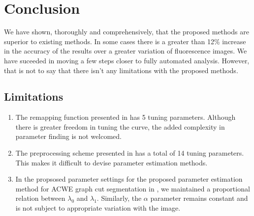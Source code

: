 
\chapter{Conclusion} %

\label{chap:Chapter7} %

We have shown, thoroughly and comprehensively, that the proposed methods are superior to existing methods. In some cases there is a greater than 12\% increase in the accuracy of the results over a greater variation of fluorescence images. We have suceeded in moving a few steps closer to fully automated analysis. However, that is not to say that there isn't any limitations with the proposed methods.

\section{Limitations}

\begin{enumerate}
	\item The remapping function presented in  has 5 tuning parameters. Although there is greater freedom in tuning the curve, the added complexity in parameter finding is not welcomed.
	
	\item The preprocessing scheme presented in  has a total of 14 tuning parameters. This makes it difficult to devise parameter estimation methods.
	
	\item In the propsosed parameter settings for the proposed parameter estimation method for ACWE graph cut segmentation in , we maintained a proportional relation between $\lambda_0$ and $\lambda_1$. Similarly, the $\alpha$ parameter remains constant and is not subject to appropriate variation with the image. 
\end{enumerate}

